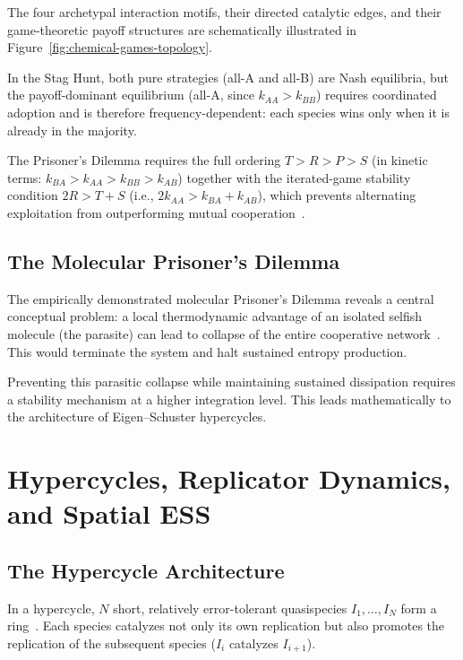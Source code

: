\documentclass[12pt,a4paper]{article}
\theoremstyle{remark}
\begin{document}
The four archetypal interaction motifs, their directed catalytic edges, and their game-theoretic payoff structures are schematically illustrated in Figure~\ref{fig:chemical-games-topology}.

\noindent
In the Stag Hunt, both pure strategies (all-A and all-B) are Nash equilibria, but the payoff-dominant equilibrium (all-A, since $k_{AA} > k_{BB}$) requires coordinated adoption and is therefore frequency-dependent: each species wins only when it is already in the majority.

The Prisoner's Dilemma requires the full ordering $T > R > P > S$ (in kinetic terms: $k_{BA} > k_{AA} > k_{BB} > k_{AB}$) together with the iterated-game stability condition $2R > T + S$ (i.e., $2k_{AA} > k_{BA} + k_{AB}$), which prevents alternating exploitation from outperforming mutual cooperation~\citep{HofbauerSigmund1998}.

\subsection{The Molecular Prisoner's Dilemma}

The empirically demonstrated molecular Prisoner's Dilemma reveals a central conceptual problem: a local thermodynamic advantage of an isolated selfish molecule (the parasite) can lead to collapse of the entire cooperative network~\citep{AzoarcusPMC}. This would terminate the system and halt sustained entropy production.

Preventing this parasitic collapse while maintaining sustained dissipation requires a stability mechanism at a higher integration level. This leads mathematically to the architecture of Eigen--Schuster hypercycles.

\section{Hypercycles, Replicator Dynamics, and Spatial ESS}
\label{sec:hypercycles}

\subsection{The Hypercycle Architecture}

In a hypercycle, $N$ short, relatively error-tolerant quasispecies $I_1, \ldots, I_N$ form a ring~\citep{Eigen1979}. Each species catalyzes not only its own replication but also promotes the replication of the subsequent species ($I_i$ catalyzes $I_{i+1}$).
\end{document}
